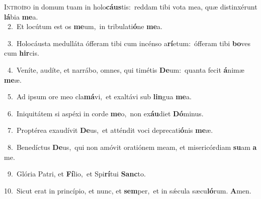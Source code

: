\lettrine{\initial\textcolor{\initialcolor}{I}}{ntroíbo} in domum tuam in holo\-\textbf{cáus}\-tis:~\star reddam tibi vota mea, quæ distinxérunt \textbf{lá}\-bia \textbf{me}\-a.\\
{\numbfont\textcolor{\numbcolor}{~2.}}~Et locútum est os \textbf{me}\-um,~\star in tribulati\-\textbf{ó}\-ne \textbf{me}\-a.\par
{\numbfont\textcolor{\numbcolor}{~3.}}~Holocáusta medulláta ófferam tibi cum incénso a\-\textbf{rí}\-etum:~\star ófferam tibi \textbf{bo}\-ves cum \textbf{hir}\-cis.\par
{\numbfont\textcolor{\numbcolor}{~4.}}~Veníte, audíte, et narrábo, omnes, qui timétis \textbf{De}\-um:~\star quanta fecit \textbf{á}\-nimæ \textbf{me}\-æ.\par
{\numbfont\textcolor{\numbcolor}{~5.}}~Ad ipsum ore meo cla\-\textbf{má}\-vi,~\star et exaltávi sub \textbf{lin}\-gua \textbf{me}\-a.\par
{\numbfont\textcolor{\numbcolor}{~6.}}~Iniquitátem si aspéxi in corde \textbf{me}\-o,~\star non ex\-\textbf{áu}\-diet \textbf{Dó}\-minus.\par
{\numbfont\textcolor{\numbcolor}{~7.}}~Proptérea exaudívit \textbf{De}\-us,~\star et atténdit voci deprecati\-\textbf{ó}\-nis \textbf{me}\-æ.\par
{\numbfont\textcolor{\numbcolor}{~8.}}~Benedíctus \textbf{De}\-us,~\star qui non amóvit oratiónem meam, et misericórdiam \textbf{su}\-am \textbf{a} me.\par
{\numbfont\textcolor{\numbcolor}{~9.}}~Glória Patri, et \textbf{Fí}\-lio,~\star et Spi\-\textbf{rí}\-tui \textbf{Sanc}\-to.\par
{\numbfont\textcolor{\numbcolor}{10.}}~Sicut erat in princípio, et nunc, et \textbf{sem}\-per,~\star et in sǽcula sæcu\-\textbf{ló}\-rum. \textbf{A}\-men.\par
